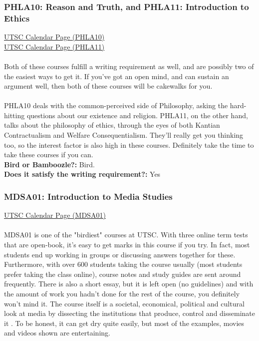 \documentclass[11pt]{article}
\begin{document}
\subsubsection{PHLA10: Reason and Truth, and PHLA11: Introduction to Ethics}
\href{https://utsc.calendar.utoronto.ca/course/PHLA10H3}{UTSC Calendar Page (PHLA10)}\\
\href{https://utsc.calendar.utoronto.ca/course/PHLA11H3}{UTSC Calendar Page (PHLA11)}\\\\
Both of these courses fulfill a writing requirement as well, and are possibly two of the easiest ways to get it.  If you've got an open mind, and can sustain an argument well, then both of these courses will be cakewalks for you.\\\\ 
PHLA10 deals with the common-perceived side of Philosophy, asking the hard-hitting questions about our existence and religion.  PHLA11, on the other hand, talks about the philosophy of ethics, through the eyes of both Kantian Contractualism and Welfare Consequentialism.  They'll really get you thinking too, so the interest factor is also high in these courses.  Definitely take the time to take these courses if you can.\\

\textbf{Bird or Bamboozle?:} Bird.\\

\textbf{Does it satisfy the writing requirement?:} Yes

\subsubsection{MDSA01: Introduction to Media Studies}
\href{https://utsc.calendar.utoronto.ca/course/MDSA01H3}{UTSC Calendar Page (MDSA01)}\\\\
MDSA01 is one of the "birdiest" courses at UTSC. With three online term tests that are open-book, it's easy to get marks in this course if you try. In fact, most students end up working in groups or discussing answers together for these. Furthermore, with over 600 students taking the course usually (most students prefer taking the class online), course notes and study guides are sent around frequently. There is also a short essay, but it is left open (no guidelines) and with the amount of work you hadn't done for the rest of the course, you definitely won't mind it. The course itself is a societal, economical, political and cultural look at media by dissecting the institutions that produce, control and disseminate it  . To be honest, it can get dry quite easily, but most of the examples, movies and videos shown are entertaining.\\
\end{document}
